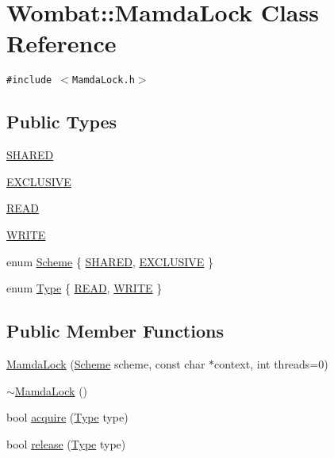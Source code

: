 \hypertarget{classWombat_1_1MamdaLock}{
\section{Wombat::Mamda\-Lock Class Reference}
\label{classWombat_1_1MamdaLock}
}
{\tt \#include $<$Mamda\-Lock.h$>$}

\subsection*{Public Types}
\begin{CompactItemize}
\item 
\hyperlink{classWombat_1_1MamdaLock_87d4e5bd1d3db6a91d9f769315bfd32e1aec4e883d9cb850c1369479aef9e1db}{SHARED}
\item 
\hyperlink{classWombat_1_1MamdaLock_87d4e5bd1d3db6a91d9f769315bfd32eebbe078a8c76bade4e757bc04016e07a}{EXCLUSIVE}
\item 
\hyperlink{classWombat_1_1MamdaLock_93b6f826e707ab70c51dac7b99bce85bb63c4e0bc9ebb8acb34b11cfc05b0a73}{READ}
\item 
\hyperlink{classWombat_1_1MamdaLock_93b6f826e707ab70c51dac7b99bce85bc464b2bdb2ad0d83befc7163693d3cb5}{WRITE}
\item 
enum \hyperlink{classWombat_1_1MamdaLock_87d4e5bd1d3db6a91d9f769315bfd32e}{Scheme} \{ \hyperlink{classWombat_1_1MamdaLock_87d4e5bd1d3db6a91d9f769315bfd32e1aec4e883d9cb850c1369479aef9e1db}{SHARED}, 
\hyperlink{classWombat_1_1MamdaLock_87d4e5bd1d3db6a91d9f769315bfd32eebbe078a8c76bade4e757bc04016e07a}{EXCLUSIVE}
 \}
\item 
enum \hyperlink{classWombat_1_1MamdaLock_93b6f826e707ab70c51dac7b99bce85b}{Type} \{ \hyperlink{classWombat_1_1MamdaLock_93b6f826e707ab70c51dac7b99bce85bb63c4e0bc9ebb8acb34b11cfc05b0a73}{READ}, 
\hyperlink{classWombat_1_1MamdaLock_93b6f826e707ab70c51dac7b99bce85bc464b2bdb2ad0d83befc7163693d3cb5}{WRITE}
 \}
\end{CompactItemize}
\subsection*{Public Member Functions}
\begin{CompactItemize}
\item 
\hyperlink{classWombat_1_1MamdaLock_e5029e03a8f6cf4925390a622f6054c9}{Mamda\-Lock} (\hyperlink{classWombat_1_1MamdaLock_87d4e5bd1d3db6a91d9f769315bfd32e}{Scheme} scheme, const char $\ast$context, int threads=0)
\item 
\hyperlink{classWombat_1_1MamdaLock_c44daceadd98c555b2ee54cc695c84e3}{$\sim$Mamda\-Lock} ()
\item 
bool \hyperlink{classWombat_1_1MamdaLock_246d89c8fc22d0eb3e539ce6a0dc4b2d}{acquire} (\hyperlink{classWombat_1_1MamdaLock_93b6f826e707ab70c51dac7b99bce85b}{Type} type)
\item 
bool \hyperlink{classWombat_1_1MamdaLock_c6eb40859055455de9f63b5aa6a47f23}{release} (\hyperlink{classWombat_1_1MamdaLock_93b6f826e707ab70c51dac7b99bce85b}{Type} type)
\end{CompactItemize}
